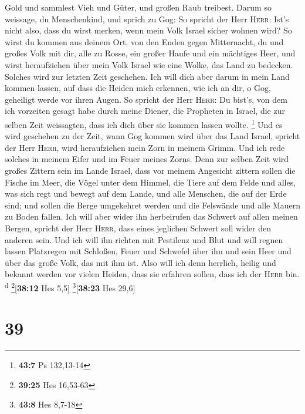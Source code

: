 Gold und sammlest Vieh und Güter, und großen Raub treibest.
 Darum so weissage, du Menschenkind, und sprich zu Gog:
So spricht der Herr \textsc{Herr}: Ist's nicht also, dass du wirst
merken, wenn mein Volk Israel sicher wohnen wird?  So
wirst du kommen aus deinem Ort, von den Enden gegen Mitternacht, du und
großes Volk mit dir, alle zu Rosse, ein großer Haufe und ein mächtiges
Heer,  und wirst heraufziehen über mein Volk Israel wie
eine Wolke, das Land zu bedecken. Solches wird zur letzten Zeit
geschehen. Ich will dich aber darum in mein Land kommen lassen, auf dass
die Heiden mich erkennen, wie ich an dir, o Gog, geheiligt werde vor
ihren Augen.  So spricht der Herr \textsc{Herr}: Du
bist's, von dem ich vorzeiten gesagt habe durch meine Diener, die
Propheten in Israel, die zur selben Zeit weissagten, dass ich dich über
sie kommen lassen wollte. \footnote{\textbf{43:7} Ps 132,13-14}
 Und es wird geschehen zu der Zeit, wann Gog kommen wird
über das Land Israel, spricht der Herr \textsc{Herr}, wird heraufziehen
mein Zorn in meinem Grimm.  Und ich rede solches in
meinem Eifer und im Feuer meines Zorns. Denn zur selben Zeit wird großes
Zittern sein im Lande Israel,  dass vor meinem Angesicht
zittern sollen die Fische im Meer, die Vögel unter dem Himmel, die Tiere
auf dem Felde und alles, was sich regt und bewegt auf dem Lande, und
alle Menschen, die auf der Erde sind; und sollen die Berge umgekehret
werden und die Felswände und alle Mauern zu Boden fallen.
 Ich will aber wider ihn herbeirufen das Schwert auf
allen meinen Bergen, spricht der Herr \textsc{Herr}, dass eines
jeglichen Schwert soll wider den anderen sein.  Und ich
will ihn richten mit Pestilenz und Blut und will regnen lassen
Platzregen mit Schloßen, Feuer und Schwefel über ihn und sein Heer und
über das große Volk, das mit ihm ist.  Also will ich denn
herrlich, heilig und bekannt werden vor vielen Heiden, dass sie erfahren
sollen, dass ich der \textsc{Herr} bin. \textsuperscript{d}
\footnote{\textbf{39:25} Hes 16,53-63}{[}\textbf{38:12} Hes 5,5{]}
\footnote{\textbf{43:8} Hes 8,7-18}{[}\textbf{38:23} Hes 29,6{]}

\hypertarget{section-38}{%
\section{39}\label{section-38}}

